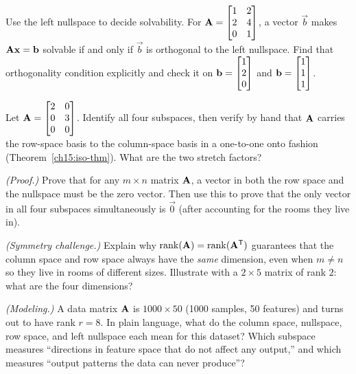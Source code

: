 \begin{exercise}\label{ch15:ex-solvability}
Use the left nullspace to decide solvability. For
$\mathbf{A}=\begin{bmatrix}1&2\\2&4\\0&1\end{bmatrix}$, a vector $\vec{b}$ makes
$\mathbf{A}\mathbf{x}=\mathbf{b}$ solvable if and only if $\vec{b}$ is orthogonal to the left nullspace. Find that
orthogonality condition explicitly and check it on $\mathbf{b}=\begin{bmatrix}1\\2\\0\end{bmatrix}$ and
$\mathbf{b}=\begin{bmatrix}1\\1\\1\end{bmatrix}$.
\end{exercise}

\begin{exercise}\label{ch15:ex-rowcol-iso}
Let $\mathbf{A}=\begin{bmatrix}2&0\\0&3\\0&0\end{bmatrix}$. Identify all four subspaces, then verify
by hand that $\mathbf{A}$ carries the row-space basis to the column-space basis in a one-to-one onto
fashion (Theorem~\ref{ch15:iso-thm}). What are the two stretch factors?
\end{exercise}

\begin{exercise}\label{ch15:ex-proof}
\emph{(Proof.)} Prove that for any $m\times n$ matrix $\mathbf{A}$, a vector in both the row space and
the nullspace must be the zero vector. Then use this to prove that the only vector in all four
subspaces simultaneously is $\vec{0}$ (after accounting for the rooms they live in).
\end{exercise}

\begin{exercise}\label{ch15:ex-transpose}
\emph{(Symmetry challenge.)} Explain why $\operatorname{rank}(\mathbf{A})=\operatorname{rank}(\mathbf{A}^{\mathsf{T}})$ guarantees that the
column space and row space always have the \emph{same} dimension, even when $m\ne n$ so they live
in rooms of different sizes. Illustrate with a $2\times 5$ matrix of rank $2$: what are the four
dimensions?
\end{exercise}

\begin{exercise}\label{ch15:ex-application}
\emph{(Modeling.)} A data matrix $\mathbf{A}$ is $1000\times 50$ (1000 samples, 50 features) and turns
out to have rank $r=8$. In plain language, what do the column space, nullspace, row space, and left
nullspace each mean for this dataset? Which subspace measures ``directions in feature space that do
not affect any output,'' and which measures ``output patterns the data can never produce''?
\end{exercise}
